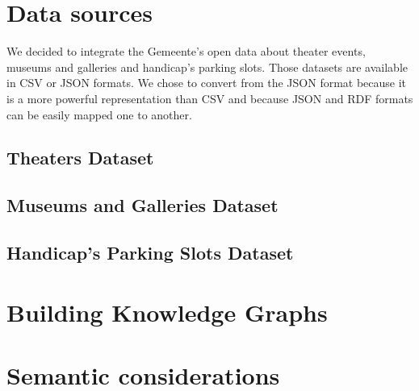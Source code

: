 \documentclass[runningheads,a4paper]{../../StyleFiles/llncs}
\begin{document}
\section{Data sources}
We decided to integrate the Gemeente's open data about theater events, museums
and galleries and handicap's parking slots. Those datasets are available in CSV
or JSON formats. We chose to convert from the JSON format because it is a more
powerful representation than CSV and because JSON and RDF formats can be easily
mapped one to another.

\subsection{Theaters Dataset}

\subsection{Museums and Galleries Dataset}

\subsection{Handicap's Parking Slots Dataset}

\section{Building Knowledge Graphs}

\section{Semantic considerations}
\end{document}
